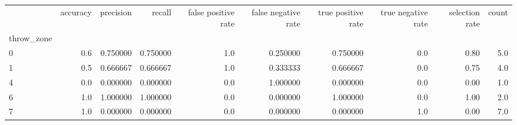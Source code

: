 \begin{tabular}{lrrrrrrrrr}
\toprule
{} &  accuracy &  precision &    recall &  false positive rate &  false negative rate &  true positive rate &  true negative rate &  selection rate &  count \\
throw\_zone &           &            &           &                      &                      &                     &                     &                 &        \\
\midrule
0          &       0.6 &   0.750000 &  0.750000 &                  1.0 &             0.250000 &            0.750000 &                 0.0 &            0.80 &    5.0 \\
1          &       0.5 &   0.666667 &  0.666667 &                  1.0 &             0.333333 &            0.666667 &                 0.0 &            0.75 &    4.0 \\
4          &       0.0 &   0.000000 &  0.000000 &                  0.0 &             1.000000 &            0.000000 &                 0.0 &            0.00 &    1.0 \\
6          &       1.0 &   1.000000 &  1.000000 &                  0.0 &             0.000000 &            1.000000 &                 0.0 &            1.00 &    2.0 \\
7          &       1.0 &   0.000000 &  0.000000 &                  0.0 &             0.000000 &            0.000000 &                 1.0 &            0.00 &    7.0 \\
\bottomrule
\end{tabular}
